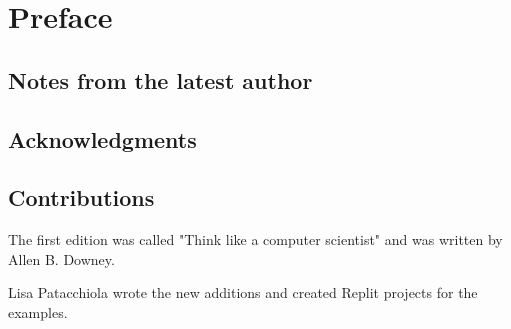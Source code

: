 
\chapter{Preface}

\section{Notes from the latest author}

\section{Acknowledgments}

\section{Contributions}
The first edition was called "Think like a computer scientist" and was written by Allen B. Downey.

Lisa Patacchiola wrote the new additions and created Replit projects for the examples. 


